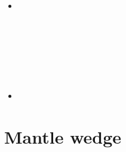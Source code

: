 \begin{scriptsize}
\begin{itemize}
\textcite{wali20} \\
\textcite{ruml20} \\
\item[\twothousandtwentyone] 
\textcite{pocv21} \\ 
\textcite{vepn21} \\
\textcite{adkc21} \\
\textcite{gath21} \\
\textcite{ligl21b} \\
\textcite{gubt21} \\
\textcite{josv21} \\
\item[\twothousandtwentytwo] 
\textcite{rikg22} \\
\end{itemize}
\end{scriptsize}


\section{Mantle wedge} 

